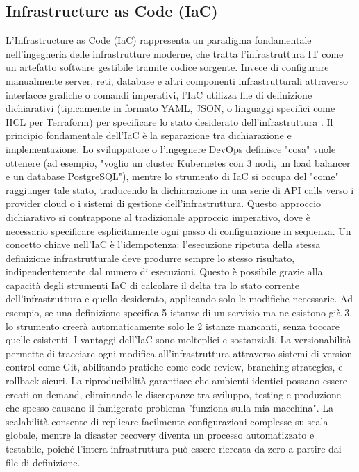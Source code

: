 \documentclass[12pt,a4paper,openright,twoside]{book}
\begin{document}
\subsection{Infrastructure as Code (IaC)}
L'Infrastructure as Code (IaC) rappresenta un paradigma fondamentale nell'ingegneria delle infrastrutture moderne, che tratta l'infrastruttura IT come un artefatto software gestibile tramite codice sorgente. Invece di configurare manualmente server, reti, database e altri componenti infrastrutturali attraverso interfacce grafiche o comandi imperativi, l'IaC utilizza file di definizione dichiarativi (tipicamente in formato YAML, JSON, o linguaggi specifici come HCL per Terraform) per specificare lo stato desiderato dell'infrastruttura \cite{teixeira2020systematic}.
Il principio fondamentale dell'IaC è la separazione tra dichiarazione e implementazione. Lo sviluppatore o l'ingegnere DevOps definisce "cosa" vuole ottenere (ad esempio, "voglio un cluster Kubernetes con 3 nodi, un load balancer e un database PostgreSQL"), mentre lo strumento di IaC si occupa del "come" raggiunger tale stato, traducendo la dichiarazione in una serie di API calls verso i provider cloud o i sistemi di gestione dell'infrastruttura. Questo approccio dichiarativo si contrappone al tradizionale approccio imperativo, dove è necessario specificare esplicitamente ogni passo di configurazione in sequenza.
Un concetto chiave nell'IaC è l'idempotenza: l'esecuzione ripetuta della stessa definizione infrastrutturale deve produrre sempre lo stesso risultato, indipendentemente dal numero di esecuzioni. Questo è possibile grazie alla capacità degli strumenti IaC di calcolare il delta tra lo stato corrente dell'infrastruttura e quello desiderato, applicando solo le modifiche necessarie. Ad esempio, se una definizione specifica 5 istanze di un servizio ma ne esistono già 3, lo strumento creerà automaticamente solo le 2 istanze mancanti, senza toccare quelle esistenti.
I vantaggi dell'IaC sono molteplici e sostanziali. La versionabilità permette di tracciare ogni modifica all'infrastruttura attraverso sistemi di version control come Git, abilitando pratiche come code review, branching strategies, e rollback sicuri. La riproducibilità garantisce che ambienti identici possano essere creati on-demand, eliminando le discrepanze tra sviluppo, testing e produzione che spesso causano il famigerato problema "funziona sulla mia macchina". La scalabilità consente di replicare facilmente configurazioni complesse su scala globale, mentre la disaster recovery diventa un processo automatizzato e testabile, poiché l'intera infrastruttura può essere ricreata da zero a partire dai file di definizione.
\end{document}
